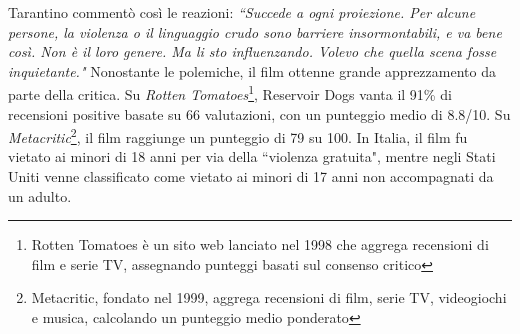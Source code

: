 \documentclass[12pt]{article} %
\begin{document}
\begin{flushleft}
    Tarantino commentò così le reazioni: \textit{``Succede a ogni proiezione. Per alcune persone, la violenza o il linguaggio crudo sono barriere insormontabili, e va bene così. Non è il loro genere. Ma li sto influenzando. Volevo che quella scena fosse inquietante."}
    Nonostante le polemiche, il film ottenne grande apprezzamento da parte della critica. Su \textit{Rotten Tomatoes}\footnote{Rotten Tomatoes è un sito web lanciato nel 1998 che aggrega recensioni di film e serie TV, assegnando punteggi basati sul consenso critico}, Reservoir Dogs vanta il 91\% di recensioni positive basate su 66 valutazioni, con un punteggio medio di 8.8/10. 
    Su \textit{Metacritic}\footnote{Metacritic, fondato nel 1999, aggrega recensioni di film, serie TV, videogiochi e musica, calcolando un punteggio medio ponderato}, il film raggiunge un punteggio di 79 su 100. 
    In Italia, il film fu vietato ai minori di 18 anni per via della ``violenza gratuita", mentre negli Stati Uniti venne classificato come vietato ai minori di 17 anni non accompagnati da un adulto.   
\end{flushleft}
\break
\end{document}
